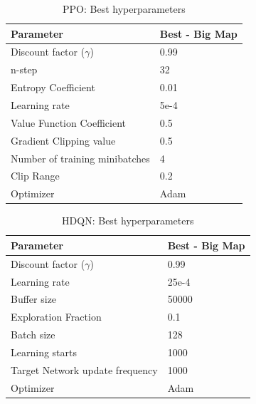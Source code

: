 \documentclass[12pt]{report}
\begin{document}
\begin{table} [!h]
\begin{center}
 \begin{tabular}{l | l} 
 \hline
 Parameter & Best - Big Map  \\ [0.5ex] 
 \hline\hline
 Discount factor ($\gamma$) & 0.99  \\
 n-step & 32\\
 Entropy Coefficient & 0.01\\
 Learning rate & 5e-4\\
 Value Function Coefficient & 0.5\\
 Gradient Clipping value &  0.5\\
 Number of training minibatches & 4\\
 Clip Range & 0.2\\
 Optimizer & Adam  \\ 
 \hline
\end{tabular}
\caption{PPO: Best hyperparameters}
\label{table:BestHDQNHyperparameterBigMap}
\end{center}
\end{table}

\begin{table} [!h]
\begin{center}
 \begin{tabular}{l | l} 
 \hline
 Parameter & Best - Big Map  \\ [0.5ex] 
 \hline\hline
 Discount factor ($\gamma$) & 0.99 \\ 
 Learning rate & 25e-4\\
 Buffer size & 50000 \\
 Exploration Fraction & 0.1\\
 Batch size  & 128\\
 Learning starts & 1000\\
 Target Network update frequency & 1000\\
 Optimizer & Adam \\ 
 \hline
\end{tabular}
\caption{HDQN: Best hyperparameters}
\label{table:BestPPOHyperparameterBigMap}
\end{center}
\end{table}
\end{document}
